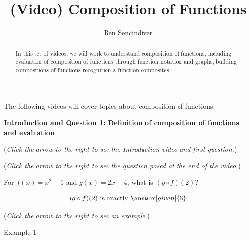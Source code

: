 \documentclass{ximera}
\title[Prerequisite Videos: ]{(Video) Composition of Functions}
\author{Ben Sencindiver}
\begin{document}
\begin{abstract}
  In this set of videos, we will work to understand
  composition of functions, including evaluation 
  of composition of functions through function 
  notation and graphs, building compositions of functions
  recognition a function composites.  
\end{abstract}
\maketitle

The following videos will cover topics about composition of functions:

\textbf{Introduction and Question 1: Definition 
  of composition of functions and  evaluation}
\begin{question}
\begin{flushright}
{\color{blue}(\emph{Click the arrow to the right to see the Introduction video and first question.})}
\end{flushright}
\begin{center}
\begin{expandable}
{\color{blue}(\emph{Click the arrow to the right to see the question
posed at the end of the video.})}
\begin{expandable}
For $f(x) = x^2 + 1$ and $g(x) =2x-4$, what is $(g \circ f)(2)$?\\
\begin{prompt}
\[
(g\circ f)(2) \text{ is exactly }\answer[given]{6}
\]
\end{prompt}
\begin{flushright}
{\color{blue}(\emph{Click the arrow to the right to see an example.})}
\end{flushright}
\begin{expandable}
Example 1
\end{expandable}
\end{expandable}
\end{expandable}
\end{center}
\end{question}
\end{document}
